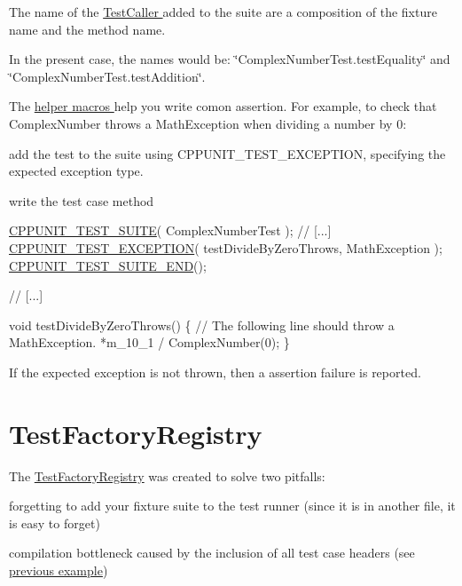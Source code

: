 The name of the \hyperlink{}{Test\+Caller } added to the suite are a composition of the fixture name and the method name.

In the present case, the names would be\+: \char`\"{}\+Complex\+Number\+Test.\+test\+Equality\char`\"{} and \char`\"{}\+Complex\+Number\+Test.\+test\+Addition\char`\"{}.

The \hyperlink{group___writing_test_fixture}{helper macros } help you write comon assertion. For example, to check that Complex\+Number throws a Math\+Exception when dividing a number by 0\+:
\begin{DoxyItemize}
\item add the test to the suite using C\+P\+P\+U\+N\+I\+T\+\_\+\+T\+E\+S\+T\+\_\+\+E\+X\+C\+E\+P\+T\+I\+O\+N, specifying the expected exception type.
\item write the test case method
\end{DoxyItemize}


\begin{DoxyCode}
\hyperlink{group___writing_test_fixture_gabe1e12200f40d6f25d60c1783c99da81}{CPPUNIT\_TEST\_SUITE}( ComplexNumberTest );
\textcolor{comment}{// [...]}
\hyperlink{group___writing_test_fixture_gaca8eeb6f60714baade6cbfd185868c40}{CPPUNIT\_TEST\_EXCEPTION}( testDivideByZeroThrows, MathException );
\hyperlink{group___writing_test_fixture_ga601b2e1d525f3947b216e28c625abcb1}{CPPUNIT\_TEST\_SUITE\_END}();

\textcolor{comment}{// [...]}

  \textcolor{keywordtype}{void} testDivideByZeroThrows()
  \{
    \textcolor{comment}{// The following line should throw a MathException.}
    *m\_10\_1 / ComplexNumber(0);
  \}
\end{DoxyCode}


If the expected exception is not thrown, then a assertion failure is reported.\hypertarget{cppunit_cookbook_test_factory_registry}{}\section{Test\+Factory\+Registry}\label{cppunit_cookbook_test_factory_registry}
The \hyperlink{class_test_factory_registry}{Test\+Factory\+Registry} was created to solve two pitfalls\+:
\begin{DoxyItemize}
\item forgetting to add your fixture suite to the test runner (since it is in another file, it is easy to forget)
\item compilation bottleneck caused by the inclusion of all test case headers (see \hyperlink{cppunit_cookbook_test_runner_code}{previous example})
\end{DoxyItemize}

